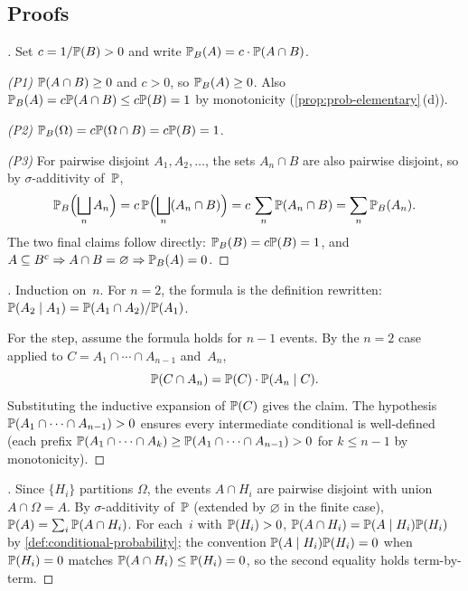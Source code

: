 \subsection*{Proofs}

\begin{proof}[]
Set $c = 1/\mathbb{P}(B) > 0$ and write
$\mathbb{P}_B(A) = c \cdot \mathbb{P}(A \cap B)$.

\emph{(P1)} $\mathbb{P}(A \cap B) \geq 0$ and $c > 0$, so $\mathbb{P}_B(A) \geq 0$.
Also $\mathbb{P}_B(A) = c \mathbb{P}(A \cap B) \leq c \mathbb{P}(B) = 1$ by
monotonicity (\cref{prop:prob-elementary}\,(d)).

\emph{(P2)} $\mathbb{P}_B(\Omega) = c \mathbb{P}(\Omega \cap B) = c \mathbb{P}(B) = 1$.

\emph{(P3)} For pairwise disjoint $A_1, A_2, \dots$, the sets
$A_n \cap B$ are also pairwise disjoint, so by $\sigma$-additivity
of~$\mathbb{P}$,
\[
  \mathbb{P}_B\Bigl(\bigsqcup_n A_n\Bigr) = c\, \mathbb{P}\Bigl(\bigsqcup_n (A_n \cap B)\Bigr) = c\, \sum_n \mathbb{P}(A_n \cap B) = \sum_n \mathbb{P}_B(A_n).
\]
The two final claims follow directly:
$\mathbb{P}_B(B) = c \mathbb{P}(B) = 1$, and $A \subseteq B^c \Rightarrow A \cap B = \varnothing \Rightarrow \mathbb{P}_B(A) = 0$.
\end{proof}

\begin{proof}[]
Induction on~$n$. For $n = 2$, the formula is the definition rewritten:
$\mathbb{P}(A_2 \mid A_1) = \mathbb{P}(A_1 \cap A_2) / \mathbb{P}(A_1)$.

For the step, assume the formula holds for $n - 1$ events. By the
$n = 2$ case applied to $C = A_1 \cap \cdots \cap A_{n-1}$ and~$A_n$,
\[
  \mathbb{P}(C \cap A_n) = \mathbb{P}(C) \cdot \mathbb{P}(A_n \mid C).
\]
Substituting the inductive expansion of $\mathbb{P}(C)$ gives the claim.
The hypothesis $\mathbb{P}(A_1 \cap \cdots \cap A_{n-1}) > 0$ ensures every
intermediate conditional is well-defined (each prefix
$\mathbb{P}(A_1 \cap \cdots \cap A_k) \geq \mathbb{P}(A_1 \cap \cdots \cap A_{n-1}) > 0$
for $k \leq n - 1$ by monotonicity).
\end{proof}

\begin{proof}[]
Since $\{H_i\}$ partitions $\Omega$, the events $A \cap H_i$ are
pairwise disjoint with union $A \cap \Omega = A$. By
$\sigma$-additivity of~$\mathbb{P}$ (extended by $\varnothing$ in the
finite case), $\mathbb{P}(A) = \sum_i \mathbb{P}(A \cap H_i)$. For each~$i$ with
$\mathbb{P}(H_i) > 0$, $\mathbb{P}(A \cap H_i) = \mathbb{P}(A \mid H_i) \mathbb{P}(H_i)$ by
\cref{def:conditional-probability}; the convention
$\mathbb{P}(A \mid H_i) \mathbb{P}(H_i) = 0$ when $\mathbb{P}(H_i) = 0$ matches
$\mathbb{P}(A \cap H_i) \leq \mathbb{P}(H_i) = 0$, so the second equality holds
term-by-term.
\end{proof}

